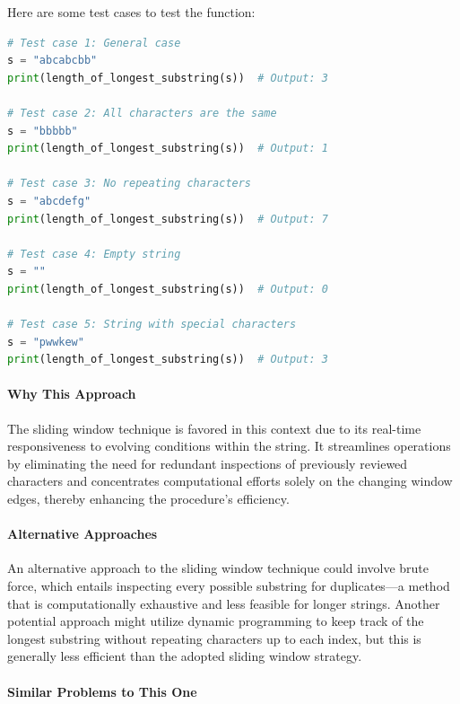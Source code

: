 Here are some test cases to test the function:

\begin{lstlisting}[language=Python]
# Test case 1: General case
s = "abcabcbb"
print(length_of_longest_substring(s))  # Output: 3

# Test case 2: All characters are the same
s = "bbbbb"
print(length_of_longest_substring(s))  # Output: 1

# Test case 3: No repeating characters
s = "abcdefg"
print(length_of_longest_substring(s))  # Output: 7

# Test case 4: Empty string
s = ""
print(length_of_longest_substring(s))  # Output: 0

# Test case 5: String with special characters
s = "pwwkew"
print(length_of_longest_substring(s))  # Output: 3
\end{lstlisting}

\paragraph*{Why This Approach}

The sliding window technique is favored in this context due to its real-time responsiveness to evolving conditions within the string. It streamlines operations by eliminating the need for redundant inspections of previously reviewed characters and concentrates computational efforts solely on the changing window edges, thereby enhancing the procedure's efficiency.

\paragraph*{Alternative Approaches}

An alternative approach to the sliding window technique could involve brute force, which entails inspecting every possible substring for duplicates—a method that is computationally exhaustive and less feasible for longer strings. Another potential approach might utilize dynamic programming to keep track of the longest substring without repeating characters up to each index, but this is generally less efficient than the adopted sliding window strategy.

\paragraph*{Similar Problems to This One}

